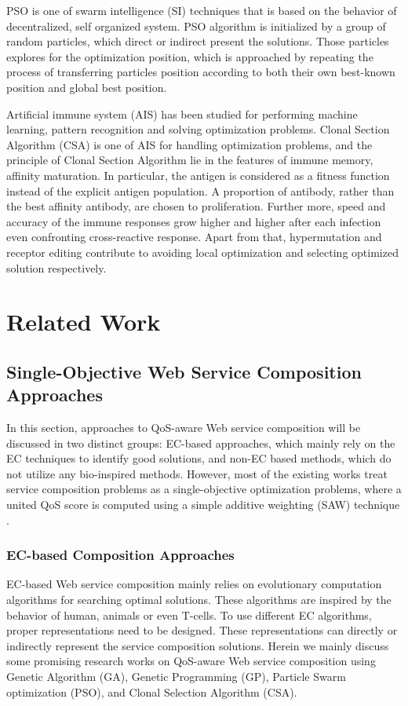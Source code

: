 PSO is one of swarm intelligence (SI) techniques that is based on the behavior of decentralized, self organized system. PSO algorithm is initialized by a group of random particles, which direct or indirect present the solutions. Those particles explores for the optimization position, which is approached by repeating the process of transferring particles position according to both their own best-known position and global best position.

Artificial immune system (AIS) has been studied for performing machine learning, pattern recognition and solving optimization problems. Clonal Section Algorithm (CSA) is one of AIS for handling optimization problems, and the principle of  Clonal Section Algorithm lie in the features of immune memory, affinity maturation. In particular, the antigen is considered as a fitness function instead of the explicit antigen population. A proportion of antibody, rather than the best affinity antibody, are chosen to proliferation. Further more, speed and accuracy of the immune responses grow higher and higher after each infection even confronting cross-reactive response. Apart from that, hypermutation and receptor editing contribute to avoiding local optimization and selecting optimized solution respectively. 


\section{Related Work}\label{related}

\subsection{Single-Objective Web Service Composition Approaches}\label{singleobjective}

In this section, approaches to QoS-aware Web service composition will be discussed in two distinct groups: EC-based approaches, which mainly rely on the EC techniques to identify good solutions, and non-EC based methods, which do not utilize any bio-inspired methods. However, most of the existing works treat service composition problems as a single-objective optimization problems, where a united QoS score is computed using a simple additive weighting (SAW) technique \cite{hwang1981lecture}.
\subsubsection{EC-based Composition Approaches}
EC-based Web service composition mainly relies on evolutionary computation algorithms for searching optimal solutions. These algorithms are inspired by the behavior of human, animals or even T-cells. To use different EC algorithms, proper representations need to be designed. These representations can directly or indirectly represent the service composition solutions. Herein we mainly discuss some promising research works on QoS-aware Web service composition using  Genetic Algorithm (GA), Genetic Programming (GP), Particle Swarm optimization (PSO), and Clonal Selection Algorithm (CSA).

